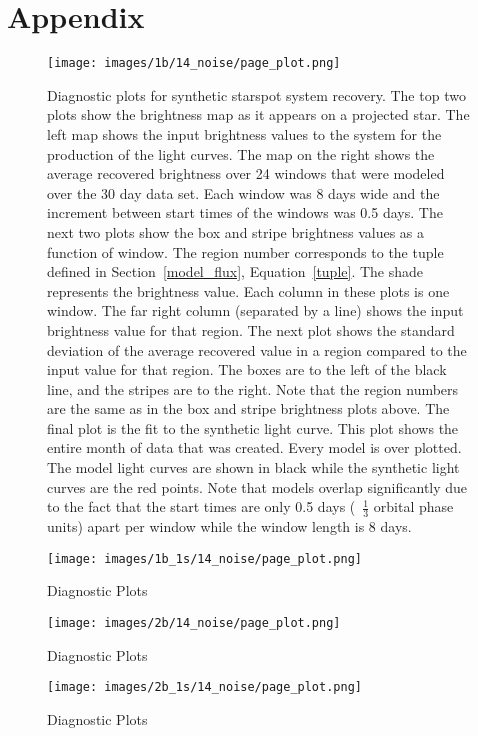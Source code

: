 

\section{Appendix \label{appendix}}
\begin{figure}[h]
	\centering
	\texttt{[image: images/1b/14\_noise/page\_plot.png]}
	\caption{Diagnostic plots for synthetic starspot system recovery. The top two plots show the brightness map as it appears on a projected star. The left map shows the input brightness values to the system for the production of the light curves. The map on the right shows the average recovered brightness over 24 windows that were modeled over the 30 day data set. Each window was 8 days wide and the increment between start times of the windows was 0.5 days. The next two plots show the box and stripe brightness values as a function of window. The region number corresponds to the tuple defined in Section~\ref{model_flux}, Equation~\ref{tuple}. The shade represents the brightness value. Each column in these plots is one window. The far right column (separated by a line) shows the input brightness value for that region. The next plot shows the standard deviation of the average recovered value in a region compared to the input value for that region. The boxes are to the left of the black line, and the stripes are to the right. Note that the region numbers are the same as in the box and stripe brightness plots above. The final plot is the fit to the synthetic light curve. This plot shows the entire month of data that was created. Every model is over plotted. The model light curves are shown in black while the synthetic light curves are the red points. Note that models overlap significantly due to the fact that the start times are only 0.5 days (~$\frac{1}{3}$ orbital phase units) apart per window while the window length is 8 days.}
	\label{page_1b}
\end{figure}
\begin{figure}[h]
	\centering
	\texttt{[image: images/1b\_1s/14\_noise/page\_plot.png]}
	\caption{Diagnostic Plots}
	\label{page_1b_1s}
\end{figure}
\begin{figure}[h]
	\centering
	\texttt{[image: images/2b/14\_noise/page\_plot.png]}
	\caption{Diagnostic Plots}
	\label{page_2b}
\end{figure}
\begin{figure}[h]
	\centering
	\texttt{[image: images/2b\_1s/14\_noise/page\_plot.png]}
	\caption{Diagnostic Plots}
	\label{page_2b_1s}
\end{figure}
